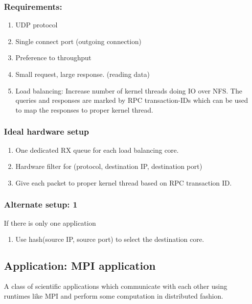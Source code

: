 \subsubsection{Requirements:}
\begin{enumerate}
    \item UDP protocol
    \item Single connect port (outgoing connection)
    \item Preference to throughput
    \item Small request, large response. (reading data)
    \item Load balancing: Increase number of kernel threads doing IO over NFS.
        The queries and responses are marked by RPC transaction-IDs which
        can be used to map the responses to proper kernel thread.
\end{enumerate}



\subsubsection{Ideal hardware setup}
\begin{enumerate}
    \item One dedicated RX queue for each load balancing core.
    \item Hardware filter for (protocol, destination IP, destination port)
    \item Give each packet to proper kernel thread based on RPC
        transaction ID.
\end{enumerate}

\subsubsection{Alternate setup: 1}
If there is only one application
\begin{enumerate}
    \item Use hash(source IP, source port) to select the destination core.
\end{enumerate}





\subsection{Application: MPI application}
A class of scientific applications which communicate with each other using
runtimes like MPI and perform some computation in distributed fashion.


